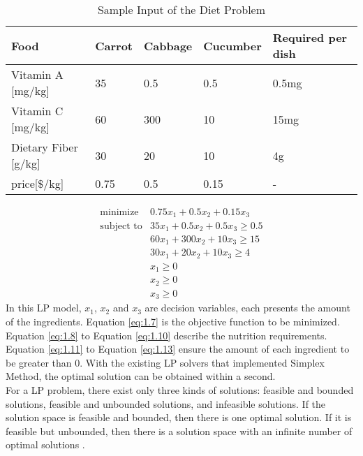\begin{table} \label{tab:1.1}
\begin{center}
\begin{tabular}{| l | l  l  l | l |}
\hline
Food & Carrot & Cabbage & Cucumber & Required per dish \\ \hline
Vitamin A [mg/kg] & 35 & 0.5 & 0.5 & 0.5mg \\ 
Vitamin C [mg/kg] & 60 & 300 & 10 & 15mg \\ 
Dietary Fiber [g/kg] & 30 & 20 & 10 & 4g \\ \hline
price[$\$$/kg] & 0.75 & 0.5 & 0.15 & - \\ \hline
\end{tabular} 
\end{center}
\caption{Sample Input of the Diet Problem}
\end{table}	

\begin{eqnarray} 
\text{minimize} & 0.75x_{1} + 0.5x_{2} +  0.15x_{3}  \label{eq:1.7} \\
\text{subject to} & 35x_{1} + 0.5x_{2} + 0.5x_{3} \geq 0.5 \label{eq:1.8} \\
& 60x_{1} + 300x_{2} + 10x_{3} \geq 15 \label{eq:1.9} \\
& 30x_{1} + 20x_{2} + 10x_{3} \geq 4 \label{eq:1.10} \\
& x_{1} \geq 0  \label{eq:1.11} \\
& x_{2} \geq 0  \label{eq:1.12} \\
& x_{3} \geq 0  \label{eq:1.13}
\end{eqnarray} 
In this LP model, $x_{1}$, $x_{2}$ and $x_{3}$ are decision variables, each presents the amount of the ingredients. Equation \ref{eq:1.7} is the objective function to be minimized. Equation \ref{eq:1.8} to Equation \ref{eq:1.10} describe the nutrition requirements. Equation \ref{eq:1.11} to Equation \ref{eq:1.13} ensure the amount of each ingredient to be greater than 0. With the existing LP solvers that implemented Simplex Method, the optimal solution can be obtained within a second. \\

For a LP problem, there exist only three kinds of solutions: feasible and bounded solutions, feasible and unbounded solutions, and infeasible solutions. If the solution space is feasible and bounded, then there is one optimal solution. If it is feasible but unbounded, then there is a solution space with an infinite number of optimal solutions \cite{LP}. \\

